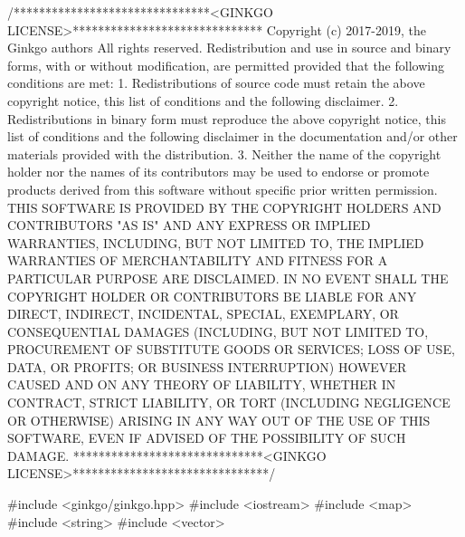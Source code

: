\begin{DoxyCodeInclude}
\textcolor{comment}{/*******************************<GINKGO LICENSE>******************************}
\textcolor{comment}{Copyright (c) 2017-2019, the Ginkgo authors}
\textcolor{comment}{All rights reserved.}
\textcolor{comment}{}
\textcolor{comment}{Redistribution and use in source and binary forms, with or without}
\textcolor{comment}{modification, are permitted provided that the following conditions}
\textcolor{comment}{are met:}
\textcolor{comment}{}
\textcolor{comment}{1. Redistributions of source code must retain the above copyright}
\textcolor{comment}{notice, this list of conditions and the following disclaimer.}
\textcolor{comment}{}
\textcolor{comment}{2. Redistributions in binary form must reproduce the above copyright}
\textcolor{comment}{notice, this list of conditions and the following disclaimer in the}
\textcolor{comment}{documentation and/or other materials provided with the distribution.}
\textcolor{comment}{}
\textcolor{comment}{3. Neither the name of the copyright holder nor the names of its}
\textcolor{comment}{contributors may be used to endorse or promote products derived from}
\textcolor{comment}{this software without specific prior written permission.}
\textcolor{comment}{}
\textcolor{comment}{THIS SOFTWARE IS PROVIDED BY THE COPYRIGHT HOLDERS AND CONTRIBUTORS "AS}
\textcolor{comment}{IS" AND ANY EXPRESS OR IMPLIED WARRANTIES, INCLUDING, BUT NOT LIMITED}
\textcolor{comment}{TO, THE IMPLIED WARRANTIES OF MERCHANTABILITY AND FITNESS FOR A}
\textcolor{comment}{PARTICULAR PURPOSE ARE DISCLAIMED. IN NO EVENT SHALL THE COPYRIGHT}
\textcolor{comment}{HOLDER OR CONTRIBUTORS BE LIABLE FOR ANY DIRECT, INDIRECT, INCIDENTAL,}
\textcolor{comment}{SPECIAL, EXEMPLARY, OR CONSEQUENTIAL DAMAGES (INCLUDING, BUT NOT}
\textcolor{comment}{LIMITED TO, PROCUREMENT OF SUBSTITUTE GOODS OR SERVICES; LOSS OF USE,}
\textcolor{comment}{DATA, OR PROFITS; OR BUSINESS INTERRUPTION) HOWEVER CAUSED AND ON ANY}
\textcolor{comment}{THEORY OF LIABILITY, WHETHER IN CONTRACT, STRICT LIABILITY, OR TORT}
\textcolor{comment}{(INCLUDING NEGLIGENCE OR OTHERWISE) ARISING IN ANY WAY OUT OF THE USE}
\textcolor{comment}{OF THIS SOFTWARE, EVEN IF ADVISED OF THE POSSIBILITY OF SUCH DAMAGE.}
\textcolor{comment}{******************************<GINKGO LICENSE>*******************************/}

\textcolor{preprocessor}{#include <ginkgo/ginkgo.hpp>}
\textcolor{preprocessor}{#include <iostream>}
\textcolor{preprocessor}{#include <map>}
\textcolor{preprocessor}{#include <string>}
\textcolor{preprocessor}{#include <vector>}



\end{DoxyCodeInclude}
